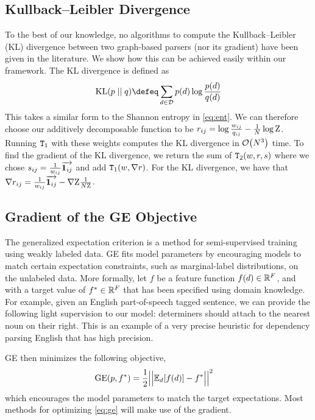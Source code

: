 \documentclass[11pt,a4paper]{article}
\newcommand{\KL}{\mathrm{KL}}
\theoremstyle{definition}
\begin{document}
\subsection{Kullback--Leibler Divergence}\label{sec:kl}
To the best of our knowledge, no algorithms to compute the Kullback--Leibler (KL) divergence between two graph-based parsers (nor its gradient) have been given in the literature.
We show how this can be achieved easily within our framework.
The KL divergence is defined as
\begin{equation}
    \KL(\prob \mid\mid \qprob) \defeq \sumtree\ptree{\tree}\log\frac{\ptree{\tree}}{\qtree{\tree}}
\end{equation}
This takes a similar form to the Shannon entropy in \cref{eq:ent}.
We can therefore choose our additively decomposable function to be ${r_{ij}}=\log\frac{{w_{ij}}}{q_{ij}} - \frac{1}{{N}}\log{\mathrm{Z}}$.
Running $\texttt{T}_1$ with these weights computes the KL divergence in $\mathcal{O}\!\left({N}^3\right)$ time.
To find the gradient of the KL divergence, we return the sum of $\texttt{T}_2\!\left( w, r, s \right)$ where we chose ${s_{ij}}=\frac{1}{{w_{ij}}}{\overrightarrow{\boldsymbol{1}_{ij}}}$ and add $\texttt{T}_1\!\left( w, \nabla r \right)$.
For the KL divergence, we have that $\nabla{r_{ij}}=\frac{1}{{w_{ij}}}{\overrightarrow{\boldsymbol{1}_{ij}}}-\nabla{\mathrm{Z}}\frac{1}{{N}{\mathrm{Z}}}$.

\subsection{Gradient of the GE Objective}\label{sec:ge}
The generalized expectation criterion \citep{mccallum2007generalized,druck-etal-2009-semi} 
is a method for semi-supervised training using weakly labeled data. 
GE fits model parameters
by encouraging models to match certain expectation constraints,
such as marginal-label distributions, on the unlabeled data.
More formally, let $f$ be a feature function $f({d})\in\mathbb{R}^{F}$, 
and with a target value of ${f^*}\in\mathbb{R}^{{F}}$ that has been specified using domain knowledge.  
For example, given an English part-of-speech tagged sentence, 
we can provide the following light supervision to our model: determiners should attach to the nearest noun on their right.  
This is an example of a very precise heuristic for dependency parsing English that has high precision.

GE then minimizes the following objective,
\begin{align}\label{eq:ge}
&\mathrm{GE}(p, {f^*}) = \frac{1}{2}\Big|\Big|{\mathbb{E}_{{d}}\!\left[ {f({d})} \right]} - {f^*} \Big|\Big|^2
\end{align}
which encourages the model parameters to match the target expectations.
Most methods for optimizing \cref{eq:ge} will make use of the gradient.
\end{document}
